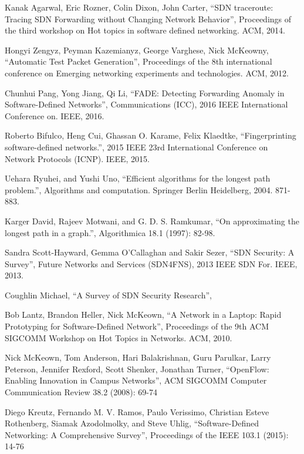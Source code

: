 \begin{thebibliography}{1}

Kanak Agarwal, Eric Rozner, Colin Dixon, John Carter,
``SDN traceroute: Tracing SDN Forwarding without Changing Network Behavior'', Proceedings of the third workshop on Hot topics in software defined networking. ACM, 2014.

Hongyi Zengyz, Peyman Kazemianyz, George Varghese, Nick McKeowny,
``Automatic Test Packet Generation'', Proceedings of the 8th international conference on Emerging networking experiments and technologies. ACM, 2012.

Chunhui Pang, Yong Jiang, Qi Li,
``FADE: Detecting Forwarding Anomaly in Software-Defined Networks'', Communications (ICC), 2016 IEEE International Conference on. IEEE, 2016.

Roberto Bifulco, Heng Cui, Ghassan O. Karame, Felix Klaedtke,
``Fingerprinting software-defined networks.'', 2015 IEEE 23rd International Conference on Network Protocols (ICNP). IEEE, 2015.

Uehara Ryuhei, and Yushi Uno,
``Efficient algorithms for the longest path problem.'', Algorithms and computation. Springer Berlin Heidelberg, 2004. 871-883.

Karger David, Rajeev Motwani, and G. D. S. Ramkumar,
``On approximating the longest path in a graph.'', Algorithmica 18.1 (1997): 82-98.

Sandra Scott-Hayward, Gemma O’Callaghan and Sakir Sezer,
``SDN Security: A Survey'', Future Networks and Services (SDN4FNS), 2013 IEEE SDN For. IEEE, 2013.

Coughlin Michael,
``A Survey of SDN Security Research'',

Bob Lantz, Brandon Heller, Nick McKeown,
``A Network in a Laptop: Rapid Prototyping for Software-Defined Network'', Proceedings of the 9th ACM SIGCOMM Workshop on Hot Topics in Networks. ACM, 2010.

Nick McKeown, Tom Anderson, Hari Balakrishnan, Guru Parulkar, Larry Peterson, Jennifer Rexford, Scott Shenker, Jonathan Turner,
``OpenFlow: Enabling Innovation in Campus Networks'', ACM SIGCOMM Computer Communication Review 38.2 (2008): 69-74

Diego Kreutz, Fernando M. V. Ramos, Paulo Verissimo, Christian Esteve Rothenberg, Siamak Azodolmolky, 
and Steve Uhlig,
``Software-Defined Networking: A Comprehensive Survey'', Proceedings of the IEEE 103.1 (2015): 14-76


\end{thebibliography}
